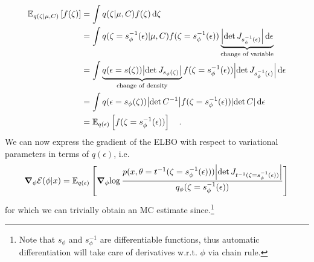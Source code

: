 \documentclass[11pt]{article}
\begin{document}
\begin{subequations}
\begin{align}
\mathbb E_{q(\zeta|\mu, C)}\left[f(\zeta)\right]  
 &= \int q(\zeta|\mu, C) f(\zeta) \dd{\zeta} \label{eq:original-expectation}\\
 &= \int q(\zeta=s^{-1}_\phi(\epsilon)|\mu, C) f(\zeta = s_\phi^{-1}(\epsilon)) \underbrace{\abs{\det J_{s_\phi^{-1}(\epsilon)}}\dd{\epsilon}}_{\text{change of variable}} \label{eq:substitution}\\
 &= \int \underbrace{q(\epsilon = s(\zeta)) \abs{\det J_{s_\phi(\zeta)}}}_{\text{change of density}} f(\zeta = s_\phi^{-1}(\epsilon)) \abs{\det J_{s_\phi^{-1}(\epsilon)}}\dd{\epsilon} \label{eq:rep-density}\\
 &= \int q(\epsilon = s_\phi(\zeta)) \abs{\det C^{-1}} f(\zeta = s_\phi^{-1}(\epsilon)) \abs{\det C}  \dd{\epsilon}  \\
 &= \mathbb E_{q(\epsilon)}\left[ f(\zeta=s_\phi^{-1}(\epsilon)) \right] \quad.
\end{align}
\end{subequations}
We can now express the gradient of the ELBO with respect to variational parameters in terms of $q(\epsilon)$, i.e.
\begin{equation}\label{eq:elbo-rep}
	\grad_\phi{\mathcal E(\phi|x)} = \mathbb E_{q(\epsilon)}\left[ \grad_\phi{\log \frac{p(x, \theta=t^{-1}(\zeta=s_\phi^{-1}(\epsilon))) \abs{\det J_{t^{-1}(\zeta=s_\phi^{-1}(\epsilon))}} }{q_\phi(\zeta=s_\phi^{-1}(\epsilon))}} \right]
\end{equation}
for which we can trivially obtain an MC estimate since.\footnote{Note that $s_\phi$ and $s_\phi^{-1}$ are differentiable functions, thus automatic differentiation will take care of derivatives w.r.t. $\phi$ via chain rule.}






\end{document}

